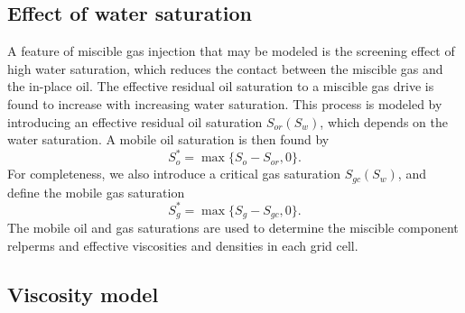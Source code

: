\documentclass[11pt, a4paper]{article}
\begin{document}
\subsection*{Effect of water saturation}

A feature of miscible gas injection that may be modeled is the screening effect of high water
saturation, which reduces the contact between the miscible gas and the in-place oil. The effective
residual oil saturation to a miscible gas drive is found to increase with increasing water
saturation. This process is modeled by introducing an effective residual oil saturation $S_{or}(S_w)$,
which depends on the water saturation. A mobile oil saturation is then found by
\begin{equation*}
  S_o^* = \max\{S_o - S_{or}, 0\}.
\end{equation*}
For completeness, we also introduce a critical gas saturation $S_{gc}(S_w)$, and define the mobile
gas saturation
\begin{equation*}
  S_g^* = \max\{S_g - S_{gc}, 0\}.
\end{equation*}
The mobile oil and gas saturations are used to determine the miscible component relperms and
effective viscosities and densities in each grid cell.

\subsection*{Viscosity model}
\end{document}
